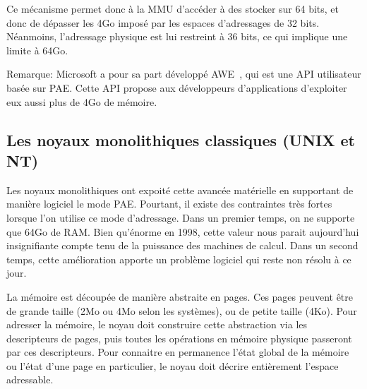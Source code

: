       Ce mécanisme permet donc à la MMU d'accéder à des stocker sur 64 bits, et
      donc de dépasser les 4Go imposé par les espaces d'adressages de 32
      bits. Néanmoins, l'adressage physique est lui restreint à 36 bits, ce qui
      implique une limite à 64Go.

      \begin{paragraph}{Remarque:}
        Microsoft a pour sa part développé AWE~\citep{russinovich2012windows},
        qui est une API utilisateur basée sur PAE. Cette API propose aux
        développeurs d'applications d'exploiter eux aussi plus de 4Go de
        mémoire.\newline
      \end{paragraph}


    \subsection{}





    \subsection{Les noyaux monolithiques classiques (UNIX et NT)}

      Les noyaux monolithiques ont expoité cette avancée matérielle en
      supportant de manière logiciel le mode PAE. Pourtant, il existe des
      contraintes très fortes lorsque l'on utilise ce mode d'adressage. Dans un
      premier temps, on ne supporte que 64Go de RAM. Bien qu'énorme en 1998,
      cette valeur nous parait aujourd'hui insignifiante compte tenu de la
      puissance des machines de calcul.  Dans un second temps, cette
      amélioration apporte un problème logiciel qui reste non résolu à ce
      jour.\newline

      La mémoire est découpée de manière abstraite en pages. Ces pages peuvent
      être de grande taille (2Mo ou 4Mo selon les systèmes), ou de petite taille
      (4Ko). Pour adresser la mémoire, le noyau doit construire cette
      abstraction via les descripteurs de pages, puis toutes les opérations en
      mémoire physique passeront par ces descripteurs. Pour connaitre en
      permanence l'état global de la mémoire ou l'état d'une page en
      particulier, le noyau doit décrire entièrement l'espace
      adressable.

